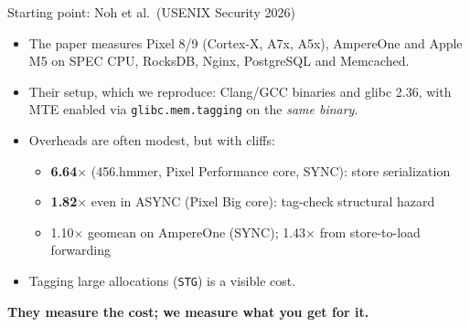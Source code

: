 \documentclass[aspectratio=169,11pt]{beamer}
\newcommand{\take}[1]{\par\vspace{4pt}{\color{accent}\rule{2pt}{1.0em}}\hspace{6pt}\textbf{#1}}
\begin{document}
\begin{frame}{Starting point: Noh et al.\ (USENIX Security 2026)}
\begin{itemize}\itemsep5pt
\item The paper measures Pixel 8/9 (Cortex-X, A7x, A5x), AmpereOne and Apple M5 on SPEC CPU, RocksDB, Nginx, PostgreSQL and Memcached.
\item Their setup, which we reproduce: Clang/GCC binaries and glibc 2.36, with MTE enabled via \texttt{glibc.mem.tagging} on the \emph{same binary}.
\item Overheads are often modest, but with cliffs:
\begin{itemize}\small
\item \textbf{6.64$\times$} (456.hmmer, Pixel Performance core, SYNC): store serialization
\item \textbf{1.82$\times$} even in ASYNC (Pixel Big core): tag-check structural hazard
\item 1.10$\times$ geomean on AmpereOne (SYNC); 1.43$\times$ from store-to-load forwarding
\end{itemize}
\item Tagging large allocations (\texttt{STG}) is a visible cost.
\end{itemize}
\take{They measure the cost; we measure what you get for it.}
\end{frame}
\end{document}
